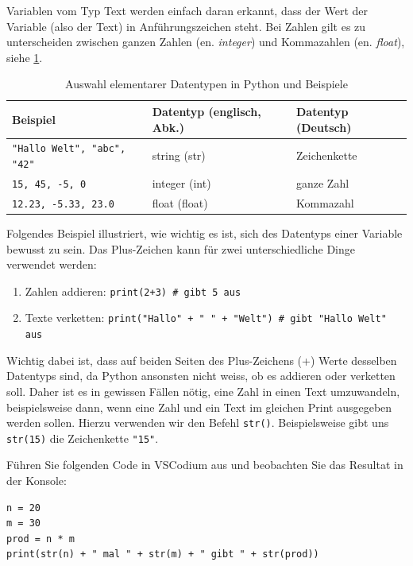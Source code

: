 Variablen vom Typ Text werden einfach daran erkannt, dass der Wert der Variable (also der Text) in Anführungszeichen steht. Bei Zahlen gilt es zu unterscheiden zwischen ganzen Zahlen (en. \textit{integer}) und Kommazahlen (en. \textit{float}), siehe \cref{tab:datatypes}.

\begin{table}[H]
	\footnotesize
	\centering
	\begin{tabular}{l|l|l}
		\textbf{Beispiel}                     & \textbf{Datentyp (englisch, Abk.)} & \textbf{Datentyp (Deutsch)} \\\midrule\midrule
		\lstinline|"Hallo Welt", "abc", "42"| & string (str)                       & Zeichenkette                \\\midrule
		\lstinline|15, 45, -5, 0|             & integer (int)                      & ganze Zahl                  \\\midrule
		\lstinline|12.23, -5.33, 23.0|        & float (float)                      & Kommazahl
	\end{tabular}
	\caption{Auswahl elementarer Datentypen in Python und Beispiele}
	\label{tab:datatypes}
\end{table}


Folgendes Beispiel illustriert, wie wichtig es ist, sich des Datentyps einer Variable bewusst zu sein. Das Plus-Zeichen kann für zwei unterschiedliche Dinge verwendet werden:
\begin{enumerate}
	\item Zahlen addieren: \lstinline|print(2+3) # gibt 5 aus|
	\item Texte verketten: \lstinline|print("Hallo" + " " + "Welt") # gibt "Hallo Welt" aus|
\end{enumerate}
Wichtig dabei ist, dass auf beiden Seiten des Plus-Zeichens (+) Werte desselben Datentyps sind, da Python ansonsten nicht weiss, ob es addieren oder verketten soll. Daher ist es in gewissen Fällen nötig, eine Zahl in einen Text umzuwandeln, beispielsweise dann, wenn eine Zahl und ein Text im gleichen Print ausgegeben werden sollen. Hierzu verwenden wir den Befehl \lstinline|str()|. Beispielsweise gibt uns \lstinline|str(15)| die Zeichenkette \lstinline|"15"|.


\begin{myexample} Führen Sie folgenden Code in VSCodium aus und beobachten Sie das Resultat in der Konsole:

\begin{lstlisting}[numbers=none]
n = 20
m = 30
prod = n * m
print(str(n) + " mal " + str(m) + " gibt " + str(prod))
\end{lstlisting}
\end{myexample}

